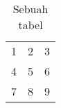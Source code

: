 \begin{table}[htbp]
    \captionsetup{labelfont=bf, textfont=bf}
    \caption{Sebuah tabel}
    \vspace{-20pt}
    \begin{center}
        \begin{tabular}{| l c r |}
            \hline
            1 & 2 & 3 \\
            4 & 5 & 6 \\
            7 & 8 & 9 \\
            \hline
        \end{tabular}
    \end{center}
    \vspace{-10pt}
    \captionsetup{labelfont=md, textfont=md}
\end{table}